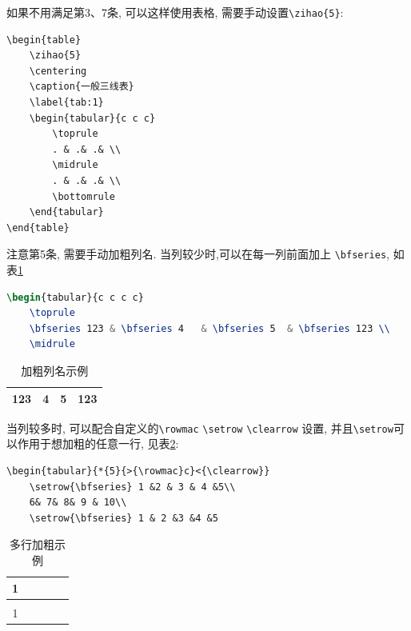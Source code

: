 如果不用满足第3、7条, 可以这样使用表格, 需要手动设置\verb|\zihao{5}|:
\begin{lstlisting}
\begin{table}
    \zihao{5}
    \centering
    \caption{一般三线表}
    \label{tab:1}
    \begin{tabular}{c c c}
        \toprule
        . & .& .& \\
        \midrule
        . & .& .& \\
        \bottomrule
    \end{tabular}
\end{table}
\end{lstlisting}
注意第5条, 需要手动加粗列名. 当列较少时,可以在每一列前面加上 \verb|\bfseries|, 如表\ref{table:simplebolditem}
\begin{lstlisting}[language=TeX]
\begin{tabular}{c c c c}
    \toprule
    \bfseries 123 & \bfseries 4   & \bfseries 5  & \bfseries 123 \\
    \midrule
\end{lstlisting}
\begin{table}[!ht]
    \caption{加粗列名示例}
    \label{table:simplebolditem}
    \centering
    \begin{tabular}{c c c c}
        \toprule
        \bfseries 123 & \bfseries 4 & \bfseries 5 & \bfseries 123 \\
        \midrule
    \end{tabular}
\end{table}
当列较多时, 可以配合自定义的\verb|\rowmac| \verb|\setrow| \verb|\clearrow| 设置, 并且\verb|\setrow|可以作用于想加粗的任意一行, 见表\ref{table:multiboldrow}:
\begin{lstlisting}
\begin{tabular}{*{5}{>{\rowmac}c}<{\clearrow}}
    \setrow{\bfseries} 1 &2 & 3 & 4 &5\\
    6& 7& 8& 9 & 10\\
    \setrow{\bfseries} 1 & 2 &3 &4 &5
\end{lstlisting}
\begin{table}[!ht]
    \centering
    \caption{多行加粗示例}
    \label{table:multiboldrow}
    \begin{tabular}{*{5}{>{\rowmac}c}<{\clearrow}}
        \toprule
        \setrow{\bfseries} 1 & 2 & 3 & 4 & 5  \\
        \midrule
        6                    & 7 & 8 & 9 & 10 \\
        \setrow{\bfseries} 1 & 2 & 3 & 4 & 5  \\
        \bottomrule
    \end{tabular}
\end{table}

